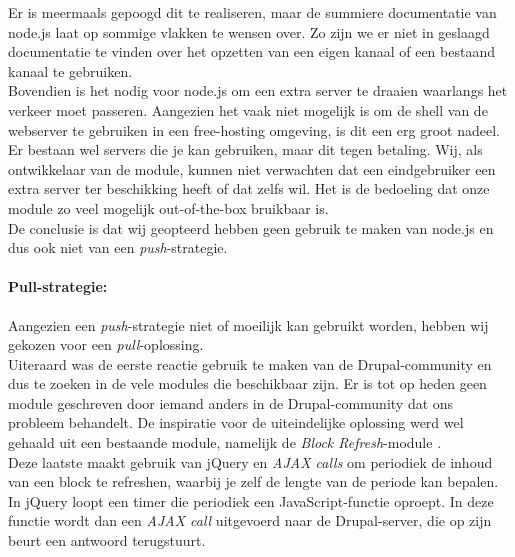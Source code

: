 Er is meermaals gepoogd dit te realiseren, maar de summiere documentatie van node.js laat op sommige vlakken te wensen over. Zo zijn we er niet in geslaagd documentatie te vinden over het opzetten van een eigen kanaal of een bestaand kanaal te gebruiken.\\
Bovendien is het nodig voor node.js om een extra server te draaien waarlangs het verkeer moet passeren. Aangezien het vaak niet mogelijk is om de shell van de webserver te gebruiken in een free-hosting omgeving, is dit een erg groot nadeel. Er bestaan wel servers die je kan gebruiken, maar dit tegen betaling. Wij, als ontwikkelaar van de module, kunnen niet verwachten dat een eindgebruiker een extra server ter beschikking heeft of dat zelfs wil. Het is de bedoeling dat onze module zo veel mogelijk out-of-the-box bruikbaar is.\\

De conclusie is dat wij geopteerd hebben geen gebruik te maken van node.js en dus ook niet van een \textit{push}-strategie.
\newpage
\paragraph{Pull-strategie: }

Aangezien een \textit{push}-strategie niet of moeilijk kan gebruikt worden, hebben wij gekozen voor een \textit{pull}-oplossing.\\

Uiteraard was de eerste reactie gebruik te maken van de Drupal-community en dus te zoeken in de vele modules die beschikbaar zijn. Er is tot op heden geen module geschreven door iemand anders in de Drupal-community dat ons probleem behandelt. De inspiratie voor de uiteindelijke oplossing werd wel gehaald uit een bestaande module, namelijk de \textit{Block Refresh}-module \cite{blockRefreshModule}.\\
Deze laatste maakt gebruik van jQuery en \textit{AJAX calls} om periodiek de inhoud van een block te refreshen, waarbij je zelf de lengte van de periode kan bepalen. In jQuery loopt een timer die periodiek een JavaScript-functie oproept. In deze functie wordt dan een \textit{AJAX call} uitgevoerd naar de Drupal-server, die op zijn beurt een antwoord terugstuurt.\\

